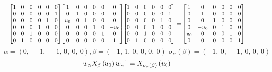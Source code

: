 \documentclass[11pt]{article}
\theoremstyle{definition}
\begin{document}
\[
\scaletoalign{\textwidth}{{\left[\begin{matrix}1 & 0 & 0 & 0 & 0 & 0\\0 & 0 & 0 & 0 & 0 & 1\\0 & 0 & 0 & 0 & 1 & 0\\0 & 0 & 0 & 1 & 0 & 0\\0 & 0 & 1 & 0 & 0 & 0\\0 & 1 & 0 & 0 & 0 & 0\end{matrix}\right]} {\left[\begin{matrix}1 & 0 & 0 & 0 & 0 & 0\\0 & 1 & 0 & 0 & 0 & 0\\u_{0} & 0 & 1 & 0 & 0 & 0\\0 & 0 & 0 & 1 & 0 & - u_{0}\\0 & 0 & 0 & 0 & 1 & 0\\0 & 0 & 0 & 0 & 0 & 1\end{matrix}\right]} {\left[\begin{matrix}1 & 0 & 0 & 0 & 0 & 0\\0 & 0 & 0 & 0 & 0 & 1\\0 & 0 & 0 & 0 & 1 & 0\\0 & 0 & 0 & 1 & 0 & 0\\0 & 0 & 1 & 0 & 0 & 0\\0 & 1 & 0 & 0 & 0 & 0\end{matrix}\right]} = {\left[\begin{matrix}1 & 0 & 0 & 0 & 0 & 0\\0 & 1 & 0 & 0 & 0 & 0\\0 & 0 & 1 & 0 & 0 & 0\\0 & - u_{0} & 0 & 1 & 0 & 0\\u_{0} & 0 & 0 & 0 & 1 & 0\\0 & 0 & 0 & 0 & 0 & 1\end{matrix}\right]}}
\]
\[
\alpha = \left( 0, \  -1, \  -1, \  0, \  0, \  0\right), \beta = \left( -1, \  1, \  0, \  0, \  0, \  0\right), \sigma_{\alpha}(\beta) = \left( -1, \  0, \  -1, \  0, \  0, \  0\right)
\]
\[
\scaletoalign{\textwidth}{w_{\alpha} X_{\beta}\left(u_{0}\right) w_{\alpha}^{-1} = X_{\sigma_{\alpha}\left(\beta\right)}\left(u_{0}\right)}
\]
\end{document}
